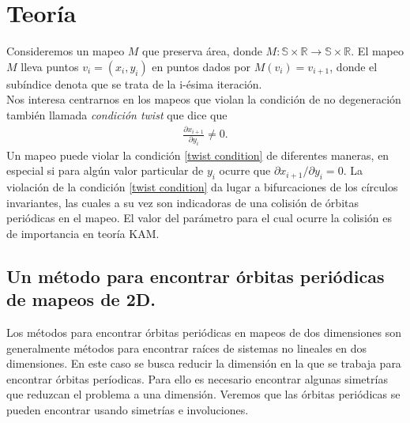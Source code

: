 
\chapter{Teor\'ia}
Consideremos un mapeo $M$ que preserva \'area, donde $M:\mathbb{S} \times \mathbb{R} \longrightarrow \mathbb{S}\times\mathbb{R}$. El mapeo $M$ lleva puntos $v_{i}= (x_{i},y_{i})$ en puntos dados por $M(v_{i})=v_{i+1}$, donde el sub\'indice denota que se trata de la i-\'esima iteraci\'on. \\

Nos interesa centrarnos en los mapeos que violan la condici\'on de no degeneraci\'on tambi\'en llamada \textit{condici\'on twist} que dice que 
\begin{eqnarray}
\frac{\partial x_{i+1}}{\partial y_{i}} \neq 0.
\label{twist condition}
\end{eqnarray}
Un mapeo puede violar la condici\'on \ref{twist condition} de diferentes maneras, en especial si para alg\'un valor particular de $y_{i}$ ocurre que $\partial x_{i+1}/\partial y_{i} = 0$. La violaci\'on de la condici\'on \ref{twist condition} da lugar a bifurcaciones de los c\'irculos invariantes, las cuales a su vez son indicadoras de una colisi\'on de \'orbitas peri\'odicas en el mapeo. El valor del par\'ametro para el cual ocurre la colisi\'on es de importancia en teor\'ia KAM. 

\section{Un m\'etodo para encontrar \'orbitas peri\'odicas de mapeos de 2D.}

Los m\'etodos para encontrar \'orbitas peri\'odicas en mapeos de dos dimensiones son generalmente m\'etodos para encontrar ra\'ices de sistemas no lineales en dos dimensiones. En este caso se busca reducir la dimensi\'on en la que se trabaja para encontrar \'orbitas per\'iodicas. Para ello es necesario encontrar algunas simetr\'ias que reduzcan el problema a una dimensi\'on. Veremos que las \'orbitas peri\'odicas se pueden encontrar usando simetr\'ias e involuciones.\\


